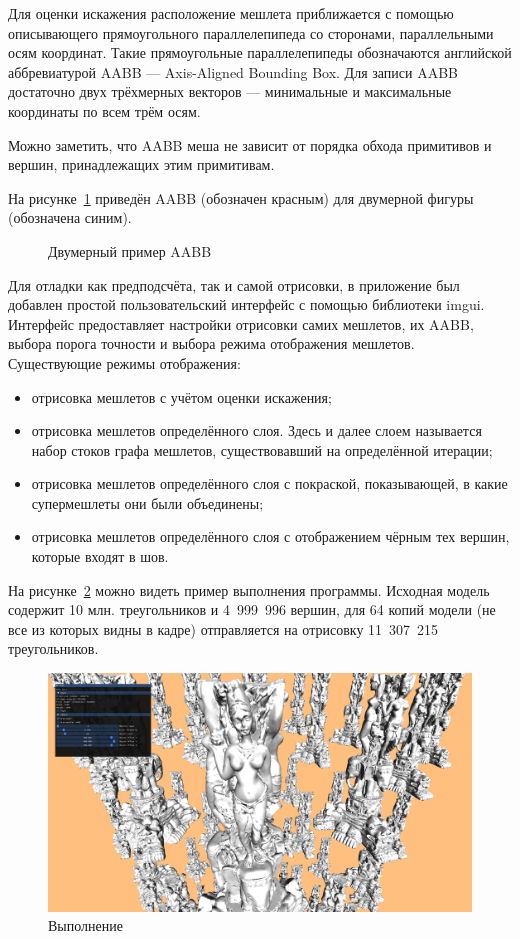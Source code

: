 Для оценки искажения расположение мешлета приближается с помощью описывающего прямоугольного параллелепипеда со сторонами, параллельными осям координат.
Такие прямоугольные параллелепипеды обозначаются английской аббревиатурой AABB --- Axis-Aligned Bounding Box.
Для записи AABB достаточно двух трёхмерных векторов --- минимальные и максимальные координаты по всем трём осям.

Можно заметить, что AABB меша не зависит от порядка обхода примитивов и вершин, принадлежащих этим примитивам.

На рисунке~\ref{fig:AABB} приведён AABB (обозначен красным) для двумерной фигуры (обозначена синим).

\begin{figure}[h]
    \centering
    \caption{Двумерный пример AABB}
    \label{fig:AABB}
\end{figure}

Для отладки как предподсчёта, так и самой отрисовки, в приложение был добавлен простой пользовательский интерфейс с помощью библиотеки imgui.
Интерфейс предоставляет настройки отрисовки самих мешлетов, их AABB, выбора порога точности и выбора режима отображения мешлетов.
Существующие режимы отображения:
\begin{itemize}
    \item отрисовка мешлетов с учётом оценки искажения;
    \item отрисовка мешлетов определённого слоя.
    Здесь и далее слоем называется набор стоков графа мешлетов, существовавший на определённой итерации;
    \item отрисовка мешлетов определённого слоя с покраской, показывающей, в какие супермешлеты они были объединены;
    \item отрисовка мешлетов определённого слоя с отображением чёрным тех вершин, которые входят в шов.
\end{itemize}

На рисунке~\ref{fig:execution-example} можно видеть пример выполнения программы.
Исходная модель содержит 10 млн. треугольников и 4~999~996 вершин, для 64 копий модели (не все из которых видны в кадре) отправляется на отрисовку 11~307~215 треугольников.

\begin{figure}[h]
    \includegraphics[width=\textwidth]{pics/impl2.png}
    \caption{Выполнение }
    \label{fig:execution-example}
\end{figure}
